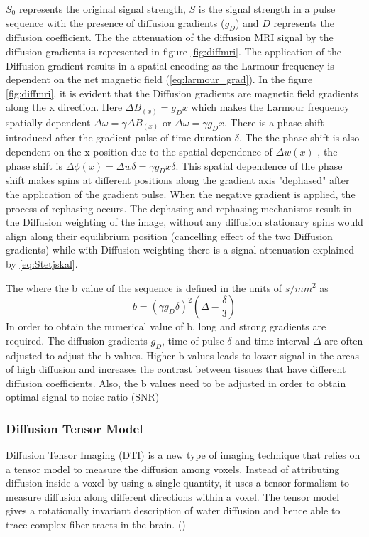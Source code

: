 \documentclass[msthesis.tex]{subfiles}
\begin{document}
$S_0$ represents the original signal strength,  $S$ is the signal strength in a pulse sequence with the presence of diffusion gradients ($g_D$) and $D$ represents the diffusion coefficient. The the attenuation of the diffusion MRI signal by the diffusion gradients is represented in figure \autoref{fig:diffmri}. The application of the Diffusion gradient results in a spatial encoding as the Larmour frequency is dependent on the net magnetic field (\autoref{eq:larmour_grad}). In the figure \autoref{fig:diffmri}, it is evident that the Diffusion gradients are magnetic field gradients along the x direction. 
Here $\Delta B_(x) = g_D x$ which makes the Larmour frequency spatially dependent $\Delta \omega = \gamma \Delta B_(x)$ or $\Delta \omega = \gamma g_D x$. There is a phase shift introduced after the gradient pulse of time duration $\delta$. The the phase shift is also dependent on the x position due to the spatial dependence of $\Delta w(x)$  ,  the phase shift is $\Delta \phi (x) = \Delta w \delta = \gamma g_D x \delta$. This spatial dependence of the phase shift makes spins at different positions along the gradient axis "dephased" after the application of the gradient pulse. When the negative gradient is applied, the process of rephasing occurs. The dephasing and rephasing mechanisms result in the Diffusion weighting of the image, without any diffusion stationary spins would align along their equilibrium position (cancelling effect of the two Diffusion gradients) while with Diffusion weighting there is a signal attenuation explained by \autoref{eq:Stetjskal}. 

The where the b value of the sequence is defined in the units of $s/mm^2$ as
\begin{equation}
    b = (\gamma g_D \delta)^2 (\Delta - \frac{\delta}{3})
\end{equation}
In order to obtain the numerical value of b, long and strong gradients are required. The diffusion gradients $g_D$, time of pulse $\delta$ and time interval $\Delta$ are often adjusted to adjust the b values. Higher b values leads to lower signal in the areas of high diffusion and increases the contrast between tissues that have different diffusion coefficients. Also, the b values need to be adjusted in order to obtain optimal signal to noise ratio (SNR)


\subsubsection{Diffusion Tensor Model}
Diffusion Tensor Imaging (DTI) is a new type of imaging technique that relies on a tensor model to measure the diffusion among voxels. Instead of attributing diffusion inside a voxel by using a single quantity, it uses a tensor formalism to measure diffusion along different directions within a voxel. The tensor model gives a rotationally invariant description of water diffusion and hence able to trace complex fiber tracts in the brain. (\cite{jones2010diffusion})
\end{document}
